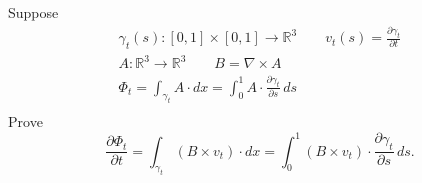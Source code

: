 \documentclass[12pt]{article}
\begin{document}
\section{}
\begin{prop}
  Suppose
  \begin{gather*}
    \gamma_t(s):[0,1]\times[0,1]\to\mathbb{R}^3
    \qquad v_t(s)=\frac{\partial\gamma_t}{\partial t}\\
    A:\mathbb{R}^3\to\mathbb{R}^3 \qquad B=\nabla\times A\\
    \Phi_t=\int_{\gamma_t}A\cdot dx
    =\int_0^1A\cdot\frac{\partial\gamma_t}{\partial s}\,ds\\
  \end{gather*}
  Prove
  \[
    \frac{\partial \Phi_t}{\partial t}
    = \int_{\gamma_t}(B\times v_t)\cdot dx
    = \int_0^1 (B\times v_t)\cdot\frac{\partial\gamma_t}{\partial s}\,ds
  .\]
\end{prop}
\end{document}
